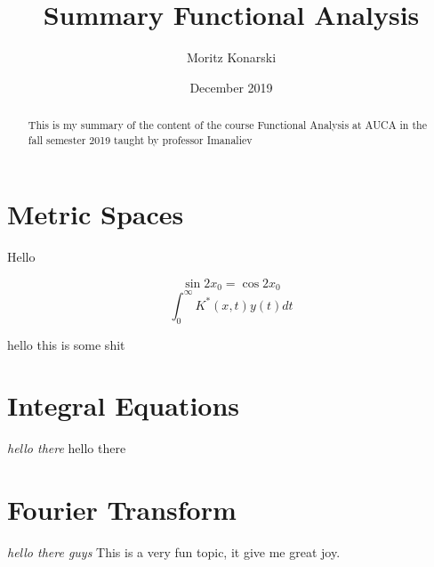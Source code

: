 \documentclass[12pt,a4paper,draft]{article}
\begin{document}
\title{Summary Functional Analysis}
\author{Moritz Konarski}
\date{December 2019}
\maketitle

\renewcommand{\abstractname}{Information}

\begin{abstract}
    This is my summary of the content of the course Functional Analysis at AUCA
    in the fall semester 2019 taught by professor Imanaliev
\end{abstract}

\tableofcontents

\section{Metric Spaces}
Hello

$$ \sin{2x_0} = \cos{2x_0} $$
$$ \int_{0}^{\infty}{K^{*}(x,t)y(t)dt} $$

hello this is some shit

\section{Integral Equations}
{\em hello there} hello there

\section{Fourier Transform}
\emph{hello there guys}
This is a very fun topic, it give me great joy.
\end{document}
